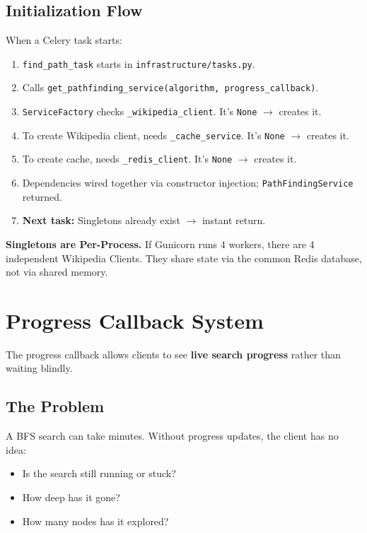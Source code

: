 \documentclass[11pt,a4paper]{article}
\begin{document}
\subsection{Initialization Flow}

When a Celery task starts:
\begin{enumerate}[leftmargin=*, nosep]
    \item \texttt{find\_path\_task} starts in \texttt{infrastructure/tasks.py}.
    \item Calls \texttt{get\_pathfinding\_service(algorithm, progress\_callback)}.
    \item \texttt{ServiceFactory} checks \texttt{\_wikipedia\_client}. It's \texttt{None} $\rightarrow$ creates it.
    \item To create Wikipedia client, needs \texttt{\_cache\_service}. It's \texttt{None} $\rightarrow$ creates it.
    \item To create cache, needs \texttt{\_redis\_client}. It's \texttt{None} $\rightarrow$ creates it.
    \item Dependencies wired together via constructor injection; \texttt{PathFindingService} returned.
    \item \textbf{Next task:} Singletons already exist $\rightarrow$ instant return.
\end{enumerate}

\begin{importantbox}
\textbf{Singletons are Per-Process.} If Gunicorn runs 4 workers, there are 4 independent Wikipedia Clients. They share state via the common Redis database, not via shared memory.
\end{importantbox}

\section{Progress Callback System}

The progress callback allows clients to see \textbf{live search progress} rather than waiting blindly.

\subsection{The Problem}

A BFS search can take minutes. Without progress updates, the client has no idea:
\begin{itemize}[leftmargin=*, nosep]
    \item Is the search still running or stuck?
    \item How deep has it gone?
    \item How many nodes has it explored?
\end{itemize}
\end{document}
